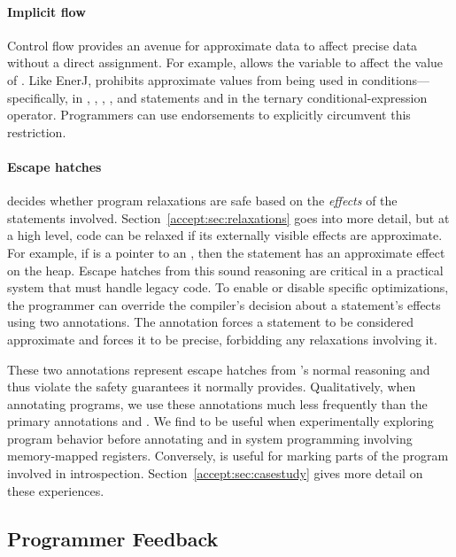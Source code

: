\paragraph{Implicit flow}
Control flow provides an avenue for approximate data to affect precise data
without a direct assignment. For example,  allows the
variable  to affect the value of .
Like EnerJ, \sysname prohibits approximate values from being used in
conditions---specifically, in , , , , and
 statements and in the ternary conditional-expression operator.
Programmers can use endorsements to explicitly circumvent this restriction.

\paragraph{Escape hatches}
\sysname decides whether program relaxations are safe based on the
\emph{effects} of the statements involved. Section~\ref{accept:sec:relaxations} goes
into more detail, but at a high level, code can be relaxed if its externally
visible effects are approximate.  For example, if  is a pointer to
an , then the statement  has an approximate effect
on the heap.
Escape hatches from this sound reasoning are critical in a practical
system that must handle legacy code.
To enable or disable specific optimizations, the programmer can
override the compiler's decision about a statement's effects using two
annotations. The \annpermit annotation forces a statement to
be considered approximate
and \annforbid forces it to be precise, forbidding
any relaxations involving it.

These two annotations represent escape hatches from \sysname's normal
reasoning and thus violate the safety guarantees it normally provides.
%
Qualitatively, when annotating programs, we use these
annotations much less frequently than the primary annotations
 and . We find \annpermit to be
useful when experimentally exploring program behavior before annotating and in
system programming involving memory-mapped registers.  Conversely,
\annforbid is useful for marking parts of the program involved in
introspection. Section~\ref{accept:sec:casestudy} gives more detail on these
experiences.

\subsection{Programmer Feedback}
\label{accept:sec:feedback}


